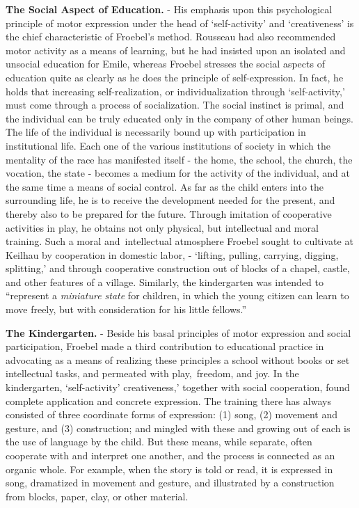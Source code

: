 \documentclass[]{book}
\begin{document}
\textbf{The Social Aspect of Education.} - His emphasis upon this psychological principle of motor expression under the head of `self-activity' and `creativeness' is the chief characteristic of Froebel's method. Rousseau had also recommended motor activity as a means of learning, but he had insisted upon an isolated and unsocial education for Emile, whereas Froebel stresses the social aspects of education quite as clearly as he does the principle of self-expression. In fact, he holds that increasing self-realization, or individualization through `self-activity,' must come through a process of socialization. The social instinct is primal, and the individual can be truly educated only in the company of other human beings. The life of the individual is necessarily bound up with participation in institutional life. Each one of the various institutions of society in which the mentality of the race has manifested itself - the home, the school, the church, the vocation, the state - becomes a medium for the activity of the individual, and at the same time a means of social control. As far as the child enters into the surrounding life, he is to receive the development needed for the present, and thereby also to be prepared for the future. Through imitation of cooperative activities in play, he obtains not only physical, but intellectual and moral training. Such a moral and~intellectual atmosphere Froebel sought to cultivate at Keilhau by cooperation in domestic labor, - `lifting, pulling, carrying, digging, splitting,' and through cooperative construction out of blocks of a chapel, castle, and other features of a village. Similarly, the kindergarten was intended to ``represent a \emph{miniature state} for children, in which the young citizen can learn to move freely, but with consideration for his little fellows.''

\textbf{The Kindergarten.} - Beside his basal principles of motor expression and social participation, Froebel made a third contribution to educational practice in advocating as a means of realizing these principles a school without books or set intellectual tasks, and permeated with play,~freedom, and joy. In the kindergarten, `self-activity' creativeness,' together with social cooperation, found complete application and concrete expression. The training there has always consisted of three coordinate forms of expression: (1) song, (2) movement and gesture, and (3) construction; and mingled with these and growing out of each is the use of language by the child. But these means, while separate, often cooperate with and interpret one another, and the process is connected as an organic whole. For example, when the story is told or read, it is expressed in song, dramatized in movement and gesture, and illustrated by a construction from blocks, paper, clay, or other material.
\end{document}
